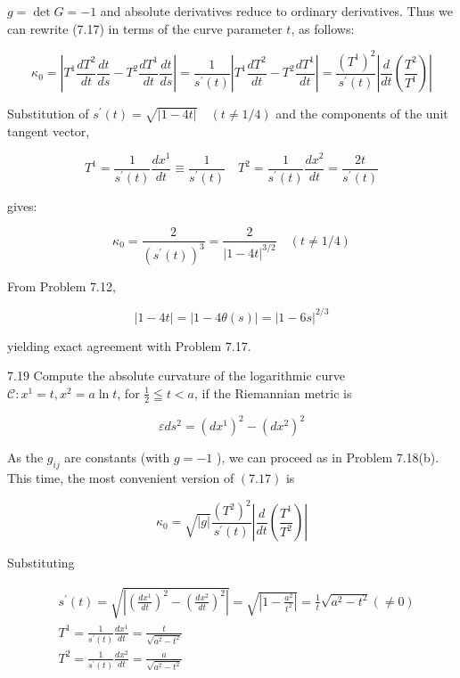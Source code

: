 \documentclass[10pt]{article}
\begin{document}
$g=\operatorname{det} G=-1$ and absolute derivatives reduce to ordinary derivatives. Thus we can rewrite (7.17) in terms of the curve parameter $t$, as follows:

$$
\kappa_{0}=\left|T^{1} \frac{d T^{2}}{d t} \frac{d t}{d s}-T^{2} \frac{d T^{1}}{d t} \frac{d t}{d s}\right|=\frac{1}{s^{\prime}(t)}\left|T^{1} \frac{d T^{2}}{d t}-T^{2} \frac{d T^{1}}{d t}\right|=\frac{\left(T^{1}\right)^{2}}{s^{\prime}(t)}\left|\frac{d}{d t}\left(\frac{T^{2}}{T^{1}}\right)\right|
$$

Substitution of $s^{\prime}(t)=\sqrt{|1-4 t|} \quad(t \neq 1 / 4)$ and the components of the unit tangent vector,

$$
T^{1}=\frac{1}{s^{\prime}(t)} \frac{d x^{1}}{d t} \equiv \frac{1}{s^{\prime}(t)} \quad T^{2}=\frac{1}{s^{\prime}(t)} \frac{d x^{2}}{d t}=\frac{2 t}{s^{\prime}(t)}
$$

gives:

$$
\kappa_{0}=\frac{2}{\left(s^{\prime}(t)\right)^{3}}=\frac{2}{|1-4 t|^{3 / 2}} \quad(t \neq 1 / 4)
$$

From Problem 7.12,

$$
|1-4 t|=|1-4 \theta(s)|=|1-6 s|^{2 / 3}
$$

yielding exact agreement with Problem 7.17.

7.19 Compute the absolute curvature of the logarithmic curve $\mathscr{C}: x^{1}=t, x^{2}=a \ln t$, for $\frac{1}{2} \leqq t<a$, if the Riemannian metric is

$$
\varepsilon d s^{2}=\left(d x^{1}\right)^{2}-\left(d x^{2}\right)^{2}
$$

As the $g_{i j}$ are constants (with $g=-1$ ), we can proceed as in Problem 7.18(b). This time, the most convenient version of $(7.17)$ is

$$
\kappa_{0}=\sqrt{|g|} \frac{\left(T^{2}\right)^{2}}{s^{\prime}(t)}\left|\frac{d}{d t}\left(\frac{T^{1}}{T^{2}}\right)\right|
$$

Substituting

$$
\begin{aligned}
& s^{\prime}(t)=\sqrt{\left|\left(\frac{d x^{1}}{d t}\right)^{2}-\left(\frac{d x^{2}}{d t}\right)^{2}\right|}=\sqrt{\left|1-\frac{a^{2}}{t^{2}}\right|}=\frac{1}{t} \sqrt{a^{2}-t^{2}}(\neq 0) \\
& T^{1}=\frac{1}{s^{\prime}(t)} \frac{d x^{1}}{d t}=\frac{t}{\sqrt{a^{2}-t^{2}}} \\
& T^{2}=\frac{1}{s^{\prime}(t)} \frac{d x^{2}}{d t}=\frac{a}{\sqrt{a^{2}-t^{2}}}
\end{aligned}
$$
\end{document}
